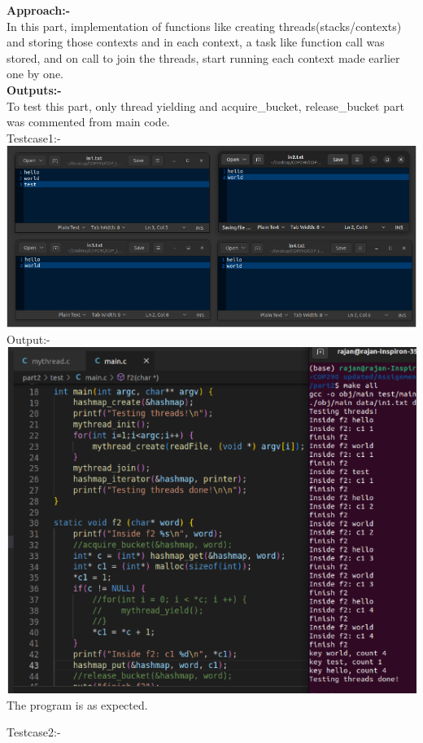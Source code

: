 \documentclass[12pt]{article}
\begin{document}
\begin{spacing}{1.2}
\textbf{Approach:-}\\
In this part, implementation of functions like creating threads(stacks/contexts) and storing those contexts and in each context, a task like function call was stored, and  on call to join the threads, start running each context made earlier one by one. \\
\textbf{Outputs:-}\\
To test this part, only thread yielding and acquire\_bucket, release\_bucket part was commented from main code. \\
Testcase1:-\\
\includegraphics[width=14cm]{images/14.png}\\
Output:-\\
\includegraphics[width=14cm]{images/15.png}\\
The program is as expected.


    \newpage

Testcase2:-\\


\end{spacing}
\end{document}

